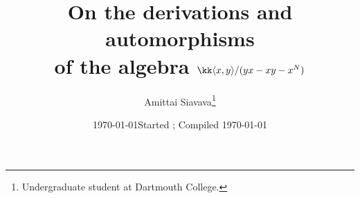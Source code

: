 

\title{%
  On the derivations and automorphisms\\
  of the algebra $\kk\langle x,y\rangle/(yx-xy-x^N)$
}
\author{Amittai Siavava\thanks{%
    Undergraduate student at Dartmouth College.
  }
}
\ifoptionfinal
  {\date{\today}}
  {\date{Started ; Compiled \today}}


\maketitle

\tableofcontents
